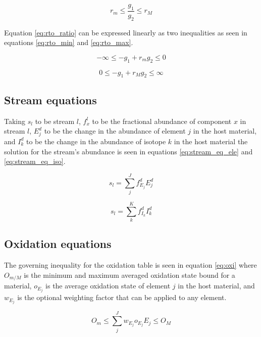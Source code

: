\documentclass[]{elsarticle}
\begin{document}
\begin{equation}
\label{eq:rto_ratio}
r_{m} \leq \frac{g_{1}}{g_{2}} \leq r_{M} 
\end{equation}

Equation \ref{eq:rto_ratio} can be expressed linearly as two inequalities as
seen in equations \ref{eq:rto_min} and \ref{eq:rto_max}.

\begin{equation}
\label{eq:rto_min}
-\infty \leq -g_{1} + r_{m}g_{2} \leq 0
\end{equation}

\begin{equation}
\label{eq:rto_max}
0 \leq -g_{1} + r_{M}g_{2} \leq \infty
\end{equation}

\subsection{Stream equations} \label{ssec:stream_eq}
Taking $s_{l}$ to be stream $l$, $f_{x}^{l}$ to be the fractional abundance
of component $x$ in stream $l$, $E_{j}^{d}$ to be the change in the 
abundance of element $j$ in the host material, and $I_{k}^{d}$ to be 
the change in the abundance of isotope $k$ in the host
material the solution for the stream's abundance is seen in equations
\ref{eq:stream_eq_ele} and \ref{eq:stream_eq_iso}.

\begin{equation}
\label{eq:stream_eq_ele}
s_{l} = \sum \limits_{j}^{J} f_{E_{j}}^{d} E_{j}^{d}
\end{equation}

\begin{equation}
\label{eq:stream_eq_iso}
s_{l} = \sum \limits_{k}^{K} f_{I_{k}}^{d} I_{k}^{d}
\end{equation}

\subsection{Oxidation equations} \label{ssec:oxid_eq}
The governing inequality for the oxidation table is seen in equation
\ref{eq:oxi} where $O_{m/M}$ is the minimum and maximum averaged oxidation
state bound for a material, $o_{E_{j}}$ is the average oxidation state of
element $j$ in the host material, and $w_{E_{j}}$ is the optional weighting
factor that can be applied to any element. 

\begin{equation}
\label{eq:oxi}
O_{m} \leq \sum \limits_{j}^{J} w_{E_{j}} o_{E_{j}} E_{j} \leq O_{M}
\end{equation}
\end{document}
